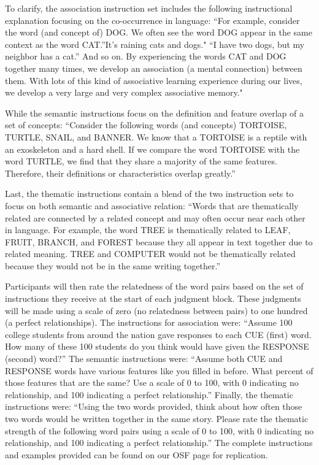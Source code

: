 \documentclass[english,man]{apa6}
\theoremstyle{definition}
\theoremstyle{definition}
\theoremstyle{definition}
\theoremstyle{remark}
\begin{document}
To clarify, the association instruction set includes the following
instructional explanation focusing on the co-occurrence in language:
\enquote{For example, consider the word (and concept of) DOG. We often
see the word DOG appear in the same context as the word CAT.}It's
raining cats and dogs." \enquote{I have two dogs, but my neighbor has a
cat.} And so on. By experiencing the words CAT and DOG together many
times, we develop an association (a mental connection) between them.
With lots of this kind of associative learning experience during our
lives, we develop a very large and very complex associative memory."

While the semantic instructions focus on the definition and feature
overlap of a set of concepts: \enquote{Consider the following words (and
concepts) TORTOISE, TURTLE, SNAIL, and BANNER. We know that a TORTOISE
is a reptile with an exoskeleton and a hard shell. If we compare the
word TORTOISE with the word TURTLE, we find that they share a majority
of the same features. Therefore, their definitions or characteristics
overlap greatly.}

Last, the thematic instructions contain a blend of the two instruction
sets to focus on both semantic and associative relation: \enquote{Words
that are thematically related are connected by a related concept and may
often occur near each other in language. For example, the word TREE is
thematically related to LEAF, FRUIT, BRANCH, and FOREST because they all
appear in text together due to related meaning. TREE and COMPUTER would
not be thematically related because they would not be in the same
writing together.}

Participants will then rate the relatedness of the word pairs based on
the set of instructions they receive at the start of each judgment
block. These judgments will be made using a scale of zero (no
relatedness between pairs) to one hundred (a perfect relationships). The
instructions for association were: \enquote{Assume 100 college students
from around the nation gave responses to each CUE (first) word. How many
of these 100 students do you think would have given the RESPONSE
(second) word?} The semantic instructions were: \enquote{Assume both CUE
and RESPONSE words have various features like you filled in before. What
percent of those features that are the same? Use a scale of 0 to 100,
with 0 indicating no relationship, and 100 indicating a perfect
relationship.} Finally, the thematic instructions were: \enquote{Using
the two words provided, think about how often those two words would be
written together in the same story. Please rate the thematic strength of
the following word pairs using a scale of 0 to 100, with 0 indicating no
relationship, and 100 indicating a perfect relationship.} The complete
instructions and examples provided can be found on our OSF page for
replication.
\end{document}
